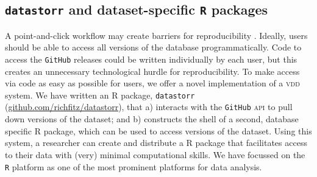 \documentclass[a4paper,11pt]{article}
\newcommand{\smurl}[1]{{\footnotesize\url{#1}}}
\begin{document}

\subsection{\texttt{datastorr} and dataset-specific \texttt{R} packages}

A point-and-click workflow may create barriers for reproducibility \citep{Wilson-2014,Lowndes-2017}. Ideally, users should be able to access all versions of the database programmatically. Code to access the \texttt{GitHub} releases could be written individually by each user, but this creates an unnecessary technological hurdle for reproducibility.  To make access via code as easy as possible for users, we offer a novel implementation of a \textsc{vdd} system. We have written an \textsc{R} package, \texttt{datastorr} (\smurl{github.com/richfitz/datastorr}), that a) interacts with the \texttt{GitHub} \textsc{api} to pull down versions of the dataset; and b) constructs the shell of a second, database specific \textsc{R} package, which can be used to access versions of the dataset. Using this system, a researcher can create and distribute a \textsc{R} package that facilitates access to their data with (very) minimal computational skills. We have focussed on the \texttt{R} platform \cite{R-2017} as one of the most prominent platforms for data analysis.
\end{document}
